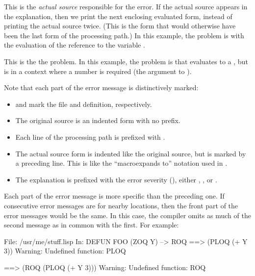 \begin{Lentry}
\item[\code{==$>$ Y}] This is the {\em actual source} responsible for
  the error.  If the actual source appears in the explanation, then we
  print the next enclosing evaluated form, instead of printing the
  actual source twice.  (This is the form that would otherwise have
  been the last form of the processing path.)  In this example, the
  problem is with the evaluation of the reference to the variable
  .
  
\item[\w{\code{Warning: Result is a SYMBOL, not a NUMBER.}}]  This is
  the  the problem.  In this example, the problem is
  that  evaluates to a , but is in a context
  where a number is required (the argument to \code{+}).
\end{Lentry}

Note that each part of the error message is distinctively marked:

\begin{itemize} 
\item {} and  mark the file and definition,
  respectively.
  
\item The original source is an indented form with no prefix.
  
\item Each line of the processing path is prefixed with \code{--$>$}.
  
\item The actual source form is indented like the original source, but
  is marked by a preceding \code{==$>$} line.  This is like the
  ``macroexpands to'' notation used in \cltl.
  
\item The explanation is prefixed with the error severity
  (), either , , or
  .
\end{itemize}


Each part of the error message is more specific than the preceding
one.  If consecutive error messages are for nearby locations, then the
front part of the error messages would be the same.  In this case, the
compiler omits as much of the second message as in common with the
first.  For example:

\begin{example}
File: /usr/me/stuff.lisp
In: DEFUN FOO
  (ZOQ Y)
--> ROQ 
==>
  (PLOQ (+ Y 3))
Warning: Undefined function: PLOQ

==>
  (ROQ (PLOQ (+ Y 3)))
Warning: Undefined function: ROQ
\end{example}

